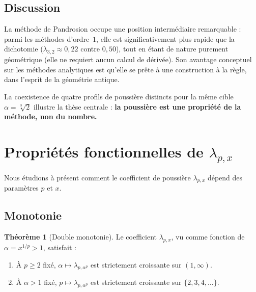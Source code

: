 \documentclass[11pt,a4paper]{article}
\theoremstyle{definition}
\newtheorem{theorem}{Théorème}[section]
\newcommand{\cbrt}[1]{\sqrt[3]{#1}}
\begin{document}
\subsection{Discussion}

La méthode de Pandrosion occupe une position intermédiaire remarquable : parmi les méthodes d'ordre~$1$, elle est significativement plus rapide que la dichotomie ($\lambda_{3,2} \approx 0{,}22$ contre $0{,}50$), tout en étant de nature purement géométrique (elle ne requiert aucun calcul de dérivée). Son avantage conceptuel sur les méthodes analytiques est qu'elle se prête à une construction à la règle, dans l'esprit de la géométrie antique.

La coexistence de quatre profils de poussière distincts pour la même cible $\alpha = \cbrt{2}$ illustre la thèse centrale : \textbf{la poussière est une propriété de la méthode, non du nombre.}

\section{Propriétés fonctionnelles de \texorpdfstring{$\lambda_{p,x}$}{lambda}}
\label{sec:functional}

Nous étudions à présent comment le coefficient de poussière $\lambda_{p,x}$ dépend des paramètres $p$ et $x$.

\subsection{Monotonie}

\begin{theorem}[Double monotonie]
\label{thm:monotonicity}
Le coefficient $\lambda_{p,x}$, vu comme fonction de $\alpha = x^{1/p} > 1$, satisfait :
\begin{enumerate}
  \item À $p \geq 2$ fixé, $\alpha \mapsto \lambda_{p,\alpha^p}$ est strictement croissante sur $(1,\infty)$.
  \item À $\alpha > 1$ fixé, $p \mapsto \lambda_{p,\alpha^p}$ est strictement croissante sur $\{2,3,4,\ldots\}$.
\end{enumerate}
\end{theorem}
\end{document}
